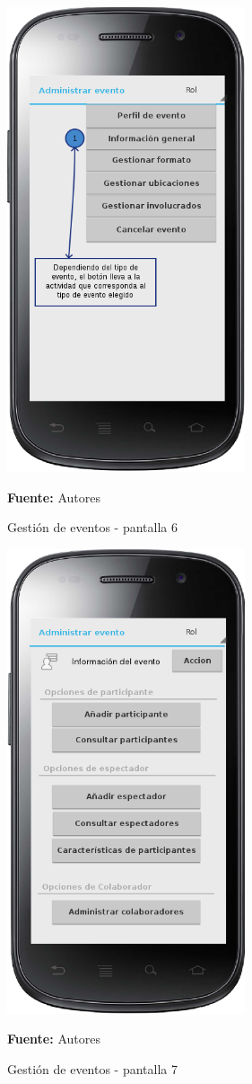 \begin{figure}[!htb]
  \begin{center}
    \includegraphics[width=7cm]{./imagenes/UI/Eventos/gestion_eventos_6.png}
    \caption{Gestión de eventos - pantalla 6}
    \label{fig:gestion_eventos_6}
    \textbf{Fuente:}  Autores
  \end{center}
\end{figure}

\begin{figure}[!htb]
  \begin{center}
    \includegraphics[width=7cm]{./imagenes/UI/Eventos/gestion_eventos_7.png}
    \caption{Gestión de eventos - pantalla 7}
    \label{fig:gestion_eventos_7}
    \textbf{Fuente:}  Autores
  \end{center}
\end{figure}

